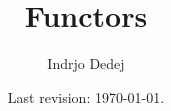 



\title{Functors}
\author{Indrjo Dedej}
\date{Last revision: \today{}.}



\maketitle

\tableofcontents






